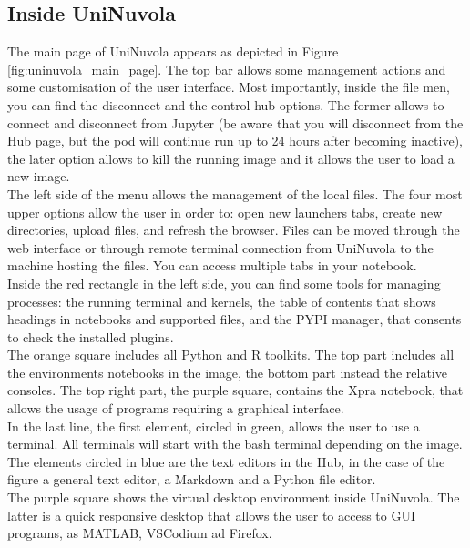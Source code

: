 \subsection{Inside UniNuvola}
The main page of UniNuvola appears as depicted in Figure \ref{fig:uninuvola_main_page}. The top bar allows some
management actions and some customisation of the user interface. Most importantly, inside the file men, you can find the
disconnect and  the control hub options. The former allows to connect and disconnect from Jupyter (be aware that you
will disconnect from the Hub page, but the pod will continue run up to 24 hours after becoming inactive), the later
option allows to kill the running image and it allows the user to load a new image. \\

The left side of the menu allows the management of the local files. The four most upper options allow the user in order
to: open new launchers tabs, create new directories, upload files, and refresh the browser. Files can be moved through
the web interface or through remote terminal connection from UniNuvola to the machine hosting the files. You can access multiple tabs in your notebook.\\ 

Inside the red rectangle in the left side, you can find some tools for managing processes: the running terminal and kernels, the table of contents that shows headings in notebooks and supported files, and the PYPI manager, that consents to check the installed plugins. \\ 

The orange square includes all Python and R toolkits. The top part includes all the environments notebooks in the image,
the bottom part instead the relative consoles. The top right part, the purple square, contains the Xpra notebook, that
allows the usage of programs requiring a graphical interface.  \\

In the last line, the first element, circled in green, allows the user to use a terminal. All terminals will start with
the bash terminal depending on the image. The elements circled in blue are the text editors in the Hub,  in the case
of the figure a general text editor, a Markdown and a Python file editor. \\

The purple square shows the virtual desktop environment inside UniNuvola. The latter is a quick responsive desktop that allows the user to access to GUI programs, as MATLAB, VSCodium ad Firefox. \\

